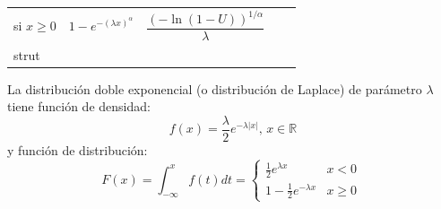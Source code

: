\documentclass[]{book}
\theoremstyle{definition}
\theoremstyle{definition}
\theoremstyle{definition}
\theoremstyle{remark}
\let\BeginKnitrBlock\begin \let\EndKnitrBlock\end
\begin{document}
\begin{longtable}[]{@{}lllll@{}}
\begin{minipage}[t]{0.17\columnwidth}
si \(x\geq0\)\strut
\end{minipage} & \begin{minipage}[t]{0.17\columnwidth}\raggedright\strut
\(1-e^{-\left( \lambda x\right) ^{\alpha}}\)\strut
\end{minipage} & \begin{minipage}[t]{0.17\columnwidth}\raggedright\strut
\(\dfrac{\left( -\ln\left(1-U\right) \right) ^{1/\alpha}}\lambda\)\strut
\end{minipage} & \begin{minipage}[t]{0.17\columnwidth}\raggedright\strut
\(\dfrac{\left( -\ln U\right)^{1/\alpha}}\lambda\)\\strut
\end{minipage}\tabularnewline
\bottomrule
\end{longtable}

\BeginKnitrBlock{exercise}
\protect\hypertarget{exr:unnamed-chunk-3}{}{\label{exr:unnamed-chunk-3} }
\EndKnitrBlock{exercise}

La distribución doble exponencial (o distribución de Laplace) de
parámetro \(\lambda\) tiene función de densidad:
\[f\left( x\right)  =\frac{\lambda}{2}e^{-\lambda\left\vert x\right\vert
}\text{, }x\in\mathbb{R}\] y función de distribución:
\[F\left( x\right)  =\int_{-\infty}^{x}f\left( t\right)  dt=\left\{
\begin{array}{ll}
\frac{1}{2}e^{\lambda x} & x<0\\
1-\frac{1}{2}e^{-\lambda x} & x\geq0
\end{array}
\ \right.\]
\end{document}
